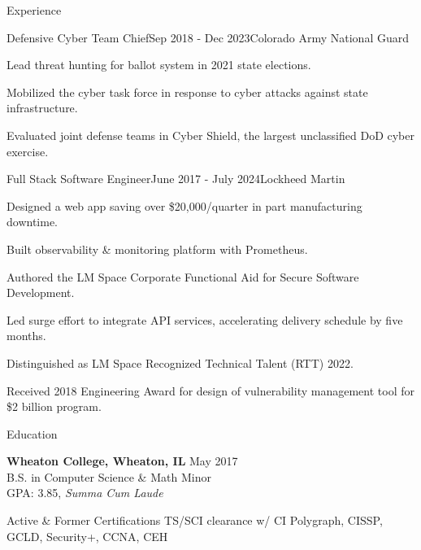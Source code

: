 \documentclass[
	a4paper, %
	11pt, %
]{resume} %
\begin{document}
\begin{rSection}{Experience}
\begin{rSubsection}{Defensive Cyber Team Chief}{Sep 2018 - Dec 2023}{Colorado Army National Guard}
		\item Lead threat hunting for ballot system in 2021 state elections.
		\item Mobilized the cyber task force in response to cyber attacks against state infrastructure.
		\item Evaluated joint defense teams in Cyber Shield, the largest unclassified DoD cyber exercise.
	\end{rSubsection}
	\begin{rSubsection}{Full Stack Software Engineer}{June 2017 - July 2024}{Lockheed Martin}
		\item Designed a web app saving over \$20,000/quarter in part manufacturing downtime.
		\item Built observability \& monitoring platform with Prometheus.
		\item Authored the LM Space Corporate Functional Aid for Secure Software Development.
		\item Led surge effort to integrate API services, accelerating delivery schedule by five months.
		\item Distinguished as LM Space Recognized Technical Talent (RTT) 2022.
		\item Received 2018 Engineering Award for design of vulnerability management tool for \$2 billion program.
	\end{rSubsection}
\end{rSection}

\begin{rSection}{Education}
	
	\textbf{Wheaton College, Wheaton, IL} \hfill May 2017 \\ 
	B.S. in Computer Science \& Math Minor \\
	GPA: 3.85, \textit{Summa Cum Laude}
	
\end{rSection}
\begin{rSection}{Active \& Former Certifications}
	TS/SCI clearance w/ CI Polygraph, CISSP, GCLD, Security+, CCNA, CEH
\end{rSection}
\end{document}
